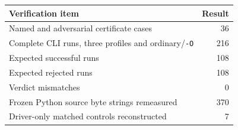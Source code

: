\begin{center}
\begin{tabular}{lr}
\toprule
Verification item & Result\\
\midrule
Named and adversarial certificate cases & 36\\
Complete CLI runs, three profiles and ordinary/\texttt{-O} & 216\\
Expected successful runs & 108\\
Expected rejected runs & 108\\
Verdict mismatches & 0\\
Frozen Python source byte strings remeasured & 370\\
Driver-only matched controls reconstructed & 7\\
\bottomrule
\end{tabular}
\end{center}
